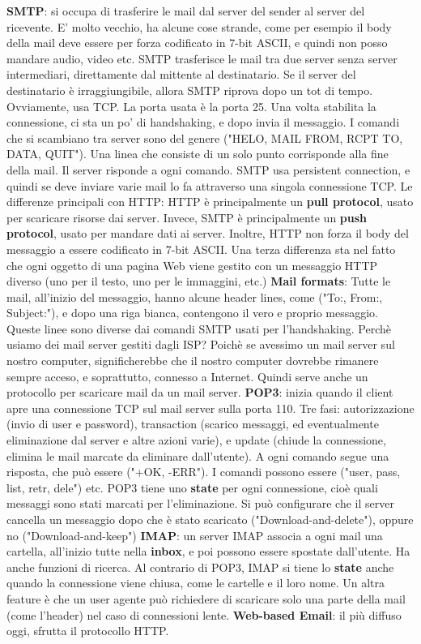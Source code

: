 \documentclass[a4paper,10pt]{article} %
\renewcommand{\b}[1]{%
    {\textbf{#1}}}
\begin{document}
\b{SMTP}: si occupa di trasferire le mail dal server del sender al server del ricevente. E' molto vecchio, ha alcune cose strande, come per esempio il body della mail deve essere per forza codificato in 7-bit ASCII, e quindi non posso mandare audio, video etc.
SMTP trasferisce le mail tra due server senza server intermediari, direttamente dal mittente al destinatario. Se il server del destinatario è irraggiungibile, allora SMTP riprova dopo un tot di tempo. Ovviamente, usa TCP. La porta usata è la porta 25.
Una volta stabilita la connessione, ci sta un po' di handshaking, e dopo invia il messaggio. I comandi che si scambiano tra server sono del genere ("HELO, MAIL FROM, RCPT TO, DATA, QUIT"). Una linea che consiste di un solo punto corrisponde alla fine della mail. Il server risponde a ogni comando.  SMTP usa persistent connection, e quindi se deve inviare varie mail lo fa attraverso una singola connessione TCP.
Le differenze principali con HTTP: HTTP è principalmente un \b{pull protocol}, usato per scaricare risorse dai server. Invece, SMTP è principalmente un \b{push protocol}, usato per mandare dati ai server. Inoltre, HTTP non forza il body del messaggio a essere codificato in 7-bit ASCII. Una terza differenza sta nel fatto che ogni oggetto di una pagina Web viene gestito con un messaggio HTTP diverso (uno per il testo, uno per le immaggini, etc.)
\b{Mail formats}: Tutte le mail, all'inizio del messaggio, hanno alcune header lines, come ("To:, From:, Subject:"), e dopo una riga bianca, contengono il vero e proprio messaggio. Queste linee sono diverse dai comandi SMTP usati per l'handshaking.
Perchè usiamo dei mail server gestiti dagli ISP? Poichè se avessimo un mail server sul nostro computer, significherebbe che il nostro computer dovrebbe rimanere sempre acceso, e soprattutto, connesso a Internet. Quindi serve anche un protocollo per scaricare mail da un mail server.
\b{POP3}: inizia quando il client apre una connessione TCP sul mail server sulla porta 110. Tre fasi: autorizzazione (invio di user e password), transaction (scarico messaggi, ed eventualmente eliminazione dal server e altre azioni varie), e update (chiude la connessione, elimina le mail marcate da eliminare dall'utente). A ogni comando segue una risposta, che può essere ("+OK, -ERR"). I comandi possono essere ("user, pass, list, retr, dele") etc.  POP3 tiene uno \b{state} per ogni connessione, cioè quali messaggi sono stati marcati per l'eliminazione. Si può configurare che il server cancella un messaggio dopo che è stato scaricato ("Download-and-delete"), oppure no ("Download-and-keep")
\b{IMAP}: un server IMAP associa a ogni mail una cartella, all'inizio tutte nella \b{inbox}, e poi possono essere spostate dall'utente. Ha anche funzioni di ricerca. Al contrario di POP3, IMAP si tiene lo \b{state} anche quando la connessione viene chiusa, come le cartelle e il loro nome. Un altra feature è che un user agente può richiedere di scaricare solo una parte della mail (come l'header) nel caso di connessioni lente.
\b{Web-based Email}: il più diffuso oggi, sfrutta il protocollo HTTP.
\end{document}
